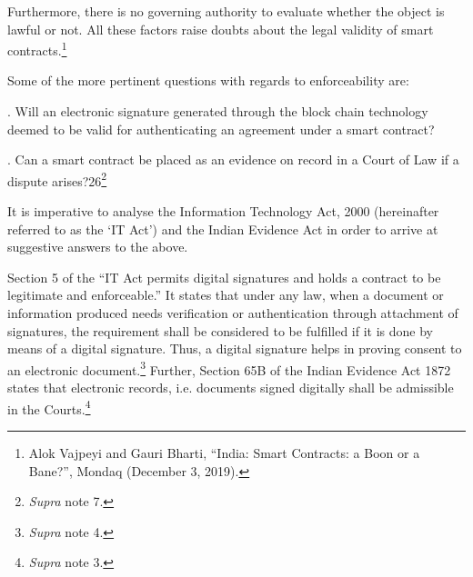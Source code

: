 \begin{multicols}{2}
\noi
Furthermore, there is no governing authority to evaluate whether the object is lawful or not.
All these factors raise doubts about the legal validity of smart contracts.\footnote{Alok Vajpeyi and Gauri Bharti, “India: Smart Contracts: a Boon or a Bane?”, Mondaq (December 3, 2019).}

\noi
Some of the more pertinent questions with regards to enforceability are: 

. Will an electronic signature generated through the block chain technology deemed to be
valid for authenticating an agreement under a smart contract? 

. Can a smart contract be placed as an evidence on record in a Court of Law if a dispute
arises?26\footnote{\textit{Supra} note 7.}

\noi
It is imperative to analyse the Information Technology Act, 2000 (hereinafter referred to as
the ‘IT Act’) and the Indian Evidence Act in order to arrive at suggestive answers to the
above.

\noi
Section 5 of the “IT Act permits digital signatures and holds a contract to be legitimate and
enforceable.” It states that under any law, when a document or information produced needs verification or authentication through attachment of signatures, the requirement shall be
considered to be fulfilled if it is done by means of a digital signature. Thus, a digital signature
helps in proving consent to an electronic document.\footnote{\textit{Supra} note 4.} Further, Section 65B of the Indian
Evidence Act 1872 states that electronic records, i.e. documents signed digitally shall be
admissible in the Courts.\footnote{\textit{Supra} note 3.}


\end{multicols}
